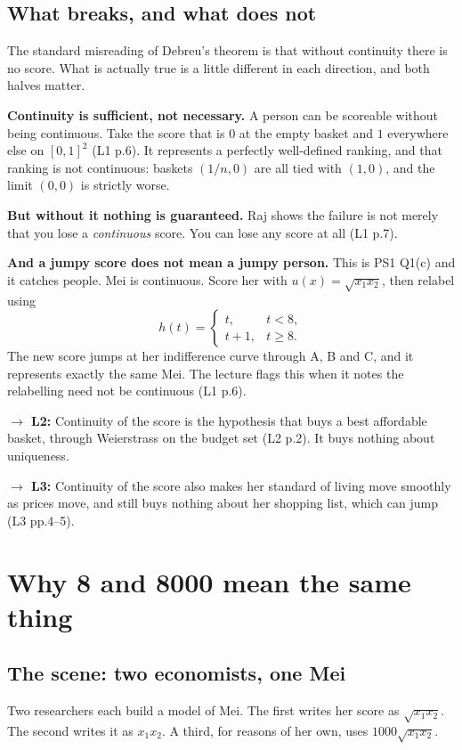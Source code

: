 \documentclass[11pt,letterpaper]{article}
\theoremstyle{definition}
\theoremstyle{plain}
\newcommand{\src}[1]{{\small\textsf{(#1)}}}
\newcommand{\fwd}[1]{\textsf{\textbf{$\rightarrow$ #1:}}}
\begin{document}
\subsection{What breaks, and what does not}

The standard misreading of Debreu's theorem is that without continuity there is no score. What is
actually true is a little different in each direction, and both halves matter.

\textbf{Continuity is sufficient, not necessary.} A person can be scoreable without being continuous.
Take the score that is $0$ at the empty basket and $1$ everywhere else on $[0,1]^2$ \src{L1 p.6}. It
represents a perfectly well-defined ranking, and that ranking is not continuous: baskets
$(1/n, 0)$ are all tied with $(1,0)$, and the limit $(0,0)$ is strictly worse.

\textbf{But without it nothing is guaranteed.} Raj shows the failure is not merely that you lose a
\emph{continuous} score. You can lose any score at all \src{L1 p.7}.

\textbf{And a jumpy score does not mean a jumpy person.} This is PS1 Q1(c) and it catches people. Mei
is continuous. Score her with $u(x) = \sqrt{x_1 x_2}$, then relabel using
\[
h(t) = \begin{cases} t, & t < 8, \\ t + 1, & t \ge 8. \end{cases}
\]
The new score jumps at her indifference curve through A, B and C, and it represents exactly the same
Mei. The lecture flags this when it notes the relabelling need not be continuous \src{L1 p.6}.

\fwd{L2} Continuity of the score is the hypothesis that buys a best affordable basket, through
Weierstrass on the budget set \src{L2 p.2}. It buys nothing about uniqueness.

\fwd{L3} Continuity of the score also makes her standard of living move smoothly as prices move, and
still buys nothing about her shopping list, which can jump \src{L3 pp.4--5}.
\section{Why 8 and 8000 mean the same thing}
\label{sec:q3}

\subsection{The scene: two economists, one Mei}

Two researchers each build a model of Mei. The first writes her score as $\sqrt{x_1 x_2}$. The
second writes it as $x_1 x_2$. A third, for reasons of her own, uses $1000\sqrt{x_1 x_2}$.
\end{document}

